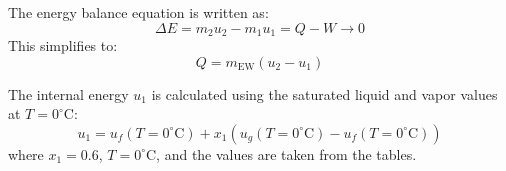The energy balance equation is written as:  
\[
\Delta E = m_2 u_2 - m_1 u_1 = Q - W \rightarrow 0
\]  
This simplifies to:  
\[
Q = m_{\text{EW}} (u_2 - u_1)
\]  

The internal energy \( u_1 \) is calculated using the saturated liquid and vapor values at \( T = 0^\circ\text{C} \):  
\[
u_1 = u_f(T = 0^\circ\text{C}) + x_1 (u_g(T = 0^\circ\text{C}) - u_f(T = 0^\circ\text{C}))
\]  
where \( x_1 = 0.6 \), \( T = 0^\circ\text{C} \), and the values are taken from the tables.